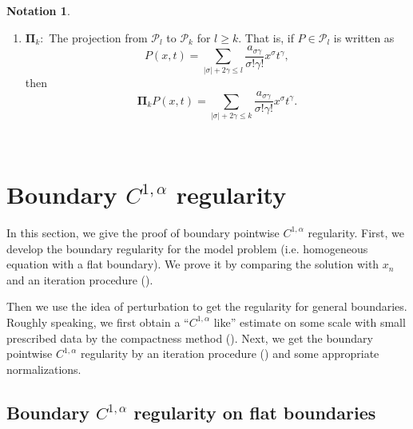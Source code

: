 \documentclass[preprint,12pt]{elsarticle}
\theoremstyle{definition}
\newtheorem{notation}[theorem]{Notation}
\theoremstyle{remark}
\numberwithin{equation}{section}
\begin{document}
\begin{notation}
\begin{enumerate}
\begin{equation*}
P(x,t)=\sum_{|\sigma|+2\gamma= k}\frac{a_{\sigma\gamma}}{\sigma!\gamma!}x^{\sigma}t^{\gamma}.
\end{equation*}
\item $\mathbf{\Pi}_k:$ The projection from $\mathcal{P}_l$ to $\mathcal{P}_k$ for $l\geq k$. That is, if $P\in \mathcal{P}_l$ is written as
\begin{equation*}
P(x,t)=\sum_{|\sigma|+2\gamma\leq l}\frac{a_{\sigma\gamma}}{\sigma!\gamma!}x^{\sigma}t^{\gamma},
\end{equation*}
then
\begin{equation*}
\mathbf{\Pi}_kP(x,t)=\sum_{|\sigma|+2\gamma\leq k}\frac{a_{\sigma\gamma}}{\sigma!\gamma!}x^{\sigma}t^{\gamma}.
\end{equation*}
\end{enumerate}
\end{notation}
~\\



\section{Boundary $C^{1,\alpha}$ regularity}\label{sec:C1a}

In this section, we give the proof of boundary pointwise $C^{1,\alpha}$ regularity. First, we develop the boundary regularity for the model problem (i.e. homogeneous equation with a flat boundary). We prove it by comparing the solution with $x_n$ and an iteration procedure ().

Then we use the idea of perturbation to get the regularity for general boundaries. Roughly speaking, we first obtain a ``$C^{1,\alpha}$ like'' estimate on some scale with small prescribed data by the compactness method (). Next, we get the boundary pointwise $C^{1,\alpha}$ regularity by an iteration procedure () and some appropriate normalizations.


\subsection{Boundary $C^{1,\alpha}$ regularity on flat boundaries}
\end{document}
